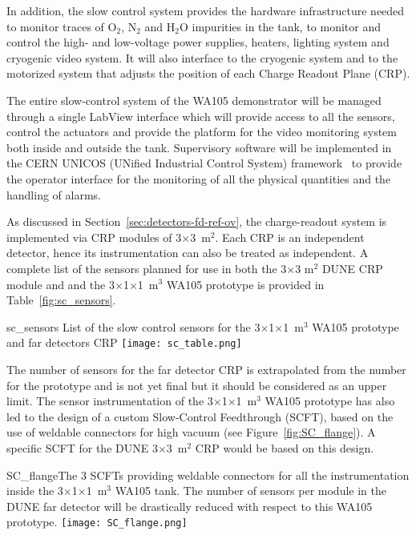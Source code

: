 In addition, the slow control system provides the hardware infrastructure needed to monitor traces of O$_2$, N$_2$ and H$_2$O impurities in the tank, to
monitor and control the high- and low-voltage power supplies, heaters, lighting system and cryogenic video system. It will also interface to the cryogenic system and to the motorized system that adjusts the position of each Charge Readout Plane (CRP).

The entire slow-control system of the WA105 demonstrator will be managed through a single LabView interface \cite{WA105_SREP} which will provide access
to all the sensors, control the actuators and provide the platform for the video  monitoring system both inside and outside the tank.  Supervisory software will be implemented in the CERN UNICOS (UNified Industrial Control System) framework~\cite{unicos} to provide the operator interface for the monitoring of all the physical quantities and the handling of alarms. 

As discussed in Section~\ref{sec:detectors-fd-ref-ov}, the charge-readout system is implemented via CRP modules of 3$\times$3~m$^2$. Each  
CRP is an independent detector, hence its instrumentation can also be treated as independent. A complete list of the sensors planned 
for use in both the 3$\times$3 m$^2$ DUNE CRP module and  and the 3$\times$1$\times$1~m$^3$ WA105 prototype is provided in
Table~\ref{fig:sc_sensors}. 

\begin{cdrfigure}{sc_sensors}
{List of the slow control sensors for the 3$\times$1$\times$1~m$^3$ WA105 prototype and far detectors CRP}
 \texttt{[image: sc\_table.png]} 
 \end{cdrfigure}

The number of sensors for the far detector CRP is extrapolated from the number for the prototype and is not yet final but it should be considered as an upper limit. The sensor instrumentation of the 3$\times$1$\times$1~m$^3$ WA105 prototype has also led to the design of a custom Slow-Control
Feedthrough (SCFT), based on the use of weldable connectors for high vacuum (see Figure~\ref{fig:SC_flange}). A specific SCFT for the DUNE 
3$\times$3~m$^2$ CRP would be based on this design.

\begin{cdrfigure}{SC_flange}{The 3 SCFTs providing 
weldable connectors for all the instrumentation inside the 3$\times$1$\times$1~m$^3$  WA105 tank. 
The number of sensors per module in the DUNE far detector will be drastically 
reduced with respect to this WA105 prototype.}
  \texttt{[image: SC\_flange.png]}
 \end{cdrfigure}
